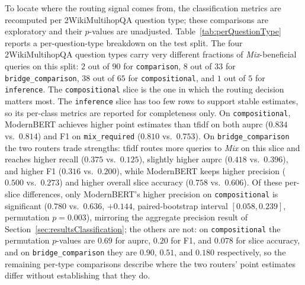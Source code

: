 \documentclass[english, bibtex]{kththesis}               %
\numberwithin{listing}{chapter}
\providecommand{\DIFaddtex}[1]{{\protect\color{blue} \sf #1}} %
\providecommand{\DIFaddbegin}{} %
\providecommand{\DIFaddend}{} %
\providecommand{\DIFadd}[1]{\texorpdfstring{\DIFaddtex{#1}}{#1}} %
\begin{document}
\DIFadd{To locate where the routing signal comes from, the classification metrics are recomputed per 2WikiMultihopQA question type; these comparisons are exploratory and their $p$-values are unadjusted. }\DIFaddend Table~\ref{tab:perQuestionType} reports a per-question-type breakdown on the test split. The four 2WikiMultihopQA question types carry very different fractions of \emph{Mix}-beneficial queries on this split: $2$ out of $90$ for \texttt{comparison}, $8$ out of $33$ for \texttt{bridge\_comparison}, $38$ out of $65$ for \texttt{compositional}, and $1$ out of $5$ for \texttt{inference}. The \texttt{compositional} slice is the one in which the routing decision matters most. The \texttt{inference} slice has too few rows to support stable estimates, so its per-class metrics are reported for completeness only. On \texttt{compositional}, ModernBERT achieves higher point estimates than \gls{tfidf} on both \gls{auprc} ($0.834$ vs.\ $0.814$) and F1 on \texttt{mix\_required} ($0.810$ vs.\ $0.753$). On \texttt{bridge\_comparison} the two routers trade strengths: \gls{tfidf} routes more queries to \emph{Mix} on this slice and reaches higher recall ($0.375$ vs.\ $0.125$), slightly higher \gls{auprc} ($0.418$ vs.\ $0.396$), and higher F1 ($0.316$ vs.\ $0.200$), while ModernBERT keeps higher precision ($0.500$ vs.\ $0.273$) and higher overall slice accuracy ($0.758$ vs.\ $0.606$). \DIFaddbegin \DIFadd{Of these per-slice differences, only ModernBERT's higher precision on \texttt{compositional} is significant ($0.780$ vs.\ $0.636$, $+0.144$, paired-bootstrap interval $[0.058, 0.239]$, permutation $p = 0.003$), mirroring the aggregate precision result of Section~\ref{sec:resultsClassification}; the others are not: on \texttt{compositional} the permutation $p$-values are $0.69$ for \gls{auprc}, $0.20$ for F1, and $0.078$ for slice accuracy, and on \texttt{bridge\_comparison} they are $0.90$, $0.51$, and $0.180$ respectively, so the remaining per-type comparisons describe where the two routers' point estimates differ without establishing that they do.
}\DIFaddend 
\end{document}
